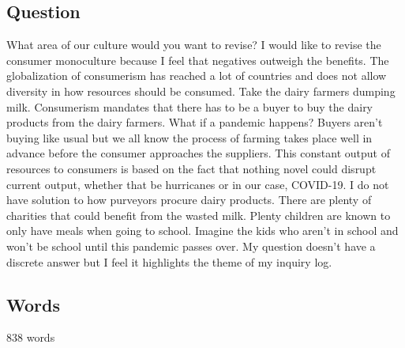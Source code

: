 \documentclass[a4paper,man,biblatex]{apa6}
\begin{document}
\subsection{Question} What area of our culture would you want to revise? I would like to revise the consumer monoculture because I feel that negatives outweigh the benefits. The globalization of consumerism has reached a lot of countries and does not allow diversity in how resources should be consumed. Take the dairy farmers dumping milk. Consumerism mandates that there has to be a buyer to buy the dairy products from the dairy farmers. What if a pandemic happens? Buyers aren't buying like usual but we all know the process of farming takes place well in advance before the consumer approaches the suppliers. This constant output of resources to consumers is based on the fact that nothing novel could disrupt current output, whether that be hurricanes or in our case, COVID-19. I do not have solution to how purveyors procure dairy products. There are plenty of charities that could benefit from the wasted milk. Plenty children are known to only have meals when going to school. Imagine the kids who aren't in school and won't be school until this pandemic passes over. My question doesn't have a discrete answer but I feel it highlights the theme of my inquiry log. 

\subsection{Words} 838 words

\printbibliography
\end{document}
